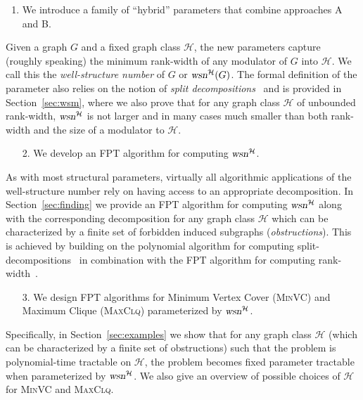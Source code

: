 \documentclass{llncs}
\def\HH{{\mathcal H}}
\newcommand{\wsn}{\text{\normalfont\slshape wsn}}
\begin{document}
\begin{enumerate}[leftmargin=*,nosep]
\item We introduce a family of ``hybrid'' parameters that combine approaches A and B. 
\end{enumerate}
\smallskip 
Given a graph $G$ and a fixed graph class $\HH$, the new parameters capture (roughly speaking) the minimum rank-width of any modulator of $G$ into $\HH$. We call this the \emph{well-structure number} of $G$ or $\wsn^\HH(G)$. The formal definition of the parameter also relies on the notion of \emph{split decompositions}~\cite{Cunningham82} and is provided in Section~\ref{sec:wsm}, where we also prove that for any graph class $\HH$ of unbounded rank-width, $\wsn^\HH$ is not larger and in many cases much smaller than both rank-width and the size of a modulator to $\HH$. 
\smallskip

\begin{enumerate}[leftmargin=*,nosep]
\item[2.] We develop an FPT algorithm for computing $\wsn^\HH$.
\end{enumerate}
\smallskip
As with most structural parameters, virtually all algorithmic applications of the well-structure number rely on having access to an appropriate decomposition. In Section~\ref{sec:finding} we provide an FPT algorithm for computing $\wsn^\HH$ along with the corresponding decomposition for any graph class $\HH$ which can be characterized by a finite set of forbidden induced subgraphs (\emph{obstructions}). This is achieved by building on the polynomial algorithm for computing split-decompositions~\cite{GioanPaulTedderCorneil14} in combination with the FPT algorithm for computing rank-width~\cite{HlinenyOum08}.\smallskip

\begin{enumerate}[leftmargin=*,nosep]
\item[3.] We design FPT algorithms for Minimum Vertex Cover (\textsc{MinVC}) and Maximum Clique (\textsc{MaxClq}) parameterized by $\wsn^\HH$.
\end{enumerate}
\smallskip
Specifically, in Section~\ref{sec:examples} we show that for any graph class $\HH$ (which can be characterized by a finite set of obstructions) such that the problem is polynomial-time tractable on $\HH$, the problem becomes fixed parameter tractable when parameterized by $\wsn^\HH$. We also give an overview of possible choices of $\HH$ for \textsc{MinVC} and \textsc{MaxClq}.
\smallskip
\end{document}
